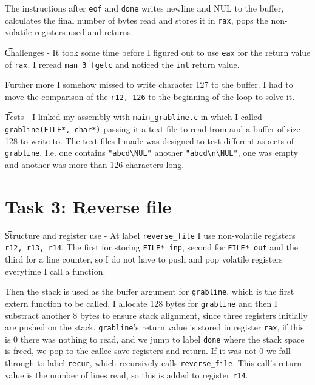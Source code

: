     The instructions after \texttt{eof} and \texttt{done} writes newline
    and NUL to the buffer, calculates the final number of bytes read and
    stores it in \texttt{rax}, pops the non-volatile registers used and
    returns.

\t{Challenges} - It took some time before I figured out to use \texttt{eax} for
the return value of \texttt{rax}. I reread \texttt{man 3 fgetc} and noticed the
\texttt{int} return value.

Further more I somehow missed to write character 127 to the buffer. I had to
move the comparison of the \texttt{r12, 126} to the beginning of the loop to
solve it.\label{chl}

\t{Tests} -
I linked my assembly with \texttt{main\_grabline.c} in which I
called \texttt{grabline(FILE*, char*)} passing it a text file to read from and
a buffer of size 128 to write to. The text files I made was designed to test
different aspects of \texttt{grabline}. I.e. one contains
\texttt{"abcd\textbackslash NUL"}
another \texttt{"abcd\textbackslash n\textbackslash NUL"}, one was empty and another was more than 126
characters long.

\section*{Task 3: Reverse file}
\t{Structure and register use} - At label \texttt{reverse\_file} I use
non-volatile registers \texttt{r12, r13, r14}. The first for storing
\texttt{FILE* inp}, second for \texttt{FILE*
out} and the third for a line counter, so I do not have to push and pop
volatile registers everytime I call a function.

Then the stack is used as the buffer argument for \texttt{grabline}, which is
the first extern function to be called. I allocate 128
bytes for \texttt{grabline} and then I substract another 8 bytes to ensure
stack alignment, since three registers initially are pushed on the stack.
\texttt{grabline}'s return value is stored in register \texttt{rax}, if this is 0
there was nothing to read, and we jump to label \texttt{done} where the
stack space is freed, we pop to the callee save registers and return. If it was
not 0 we fall through to label \texttt{recur}, which recursively calls
\texttt{reverse\_file}. This call's return value is the number of lines read,
so this is added to register \texttt{r14}.

